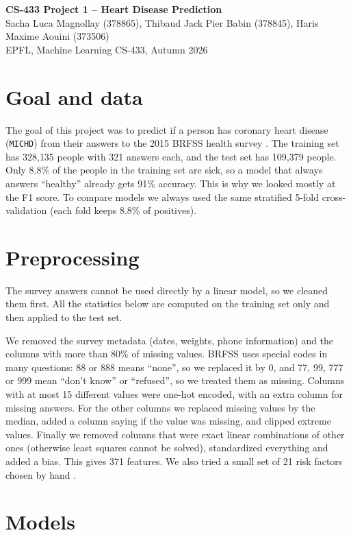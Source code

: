 \documentclass[11pt,a4paper]{article}
\begin{document}
\begin{center}
{\Large \textbf{CS-433 Project 1 -- Heart Disease Prediction}}\\[4pt]
Sacha Luca Magnollay (378865), Thibaud Jack Pier Babin (378845), Haris Maxime Aouini (373506)\\
EPFL, Machine Learning CS-433, Autumn 2026
\end{center}

\section{Goal and data}

The goal of this project was to predict if a person has coronary heart disease (\texttt{MICHD}) from their answers to the 2015 BRFSS health survey \cite{brfss2015}. The training set has 328{,}135 people with 321 answers each, and the test set has 109{,}379 people. Only 8.8\% of the people in the training set are sick, so a model that always answers ``healthy'' already gets 91\% accuracy. This is why we looked mostly at the F1 score. To compare models we always used the same stratified 5-fold cross-validation (each fold keeps 8.8\% of positives).

\section{Preprocessing}

The survey answers cannot be used directly by a linear model, so we cleaned them first. All the statistics below are computed on the training set only and then applied to the test set.

We removed the survey metadata (dates, weights, phone information) and the columns with more than 80\% of missing values. BRFSS uses special codes in many questions: 88 or 888 means ``none'', so we replaced it by 0, and 77, 99, 777 or 999 mean ``don't know'' or ``refused'', so we treated them as missing. Columns with at most 15 different values were one-hot encoded, with an extra column for missing answers. For the other columns we replaced missing values by the median, added a column saying if the value was missing, and clipped extreme values. Finally we removed columns that were exact linear combinations of other ones (otherwise least squares cannot be solved), standardized everything and added a bias. This gives 371 features. We also tried a small set of 21 risk factors chosen by hand \cite{xie2019building, teboulheart}.

\section{Models}
\end{document}
